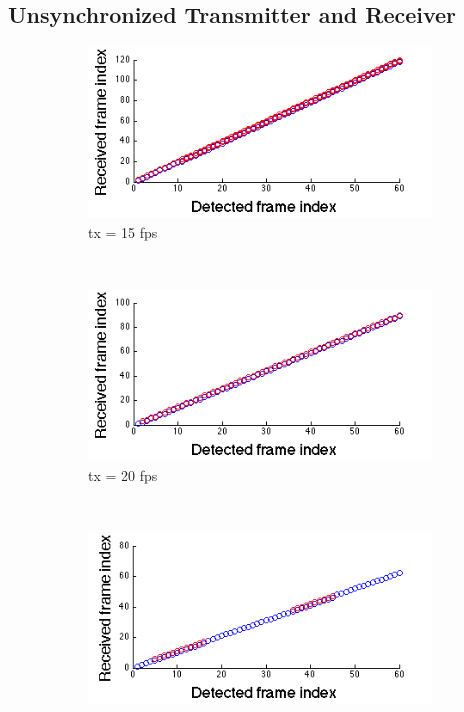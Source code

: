 \subsection{Unsynchronized Transmitter and Receiver}

\begin{figure}[!t]
   \centering
   \begin{subfigure}[h]{0.25\textwidth}
      \includegraphics[width=\textwidth]{fig/tx_15_new.png}
      \caption{tx = 15 fps} \label{fig:tx_15fps}
   \end{subfigure}%
   ~
   \begin{subfigure}[h]{0.25\textwidth}
      \includegraphics[width=\textwidth]{fig/tx_20_new.png}
      \caption{tx = 20 fps} \label{fig:tx_20fps}
   \end{subfigure}%
   ~  
   \begin{subfigure}[h]{0.25\textwidth}
      \includegraphics[width=\textwidth]{fig/tx_29_new.png}

\end{subfigure}
\end{figure}
